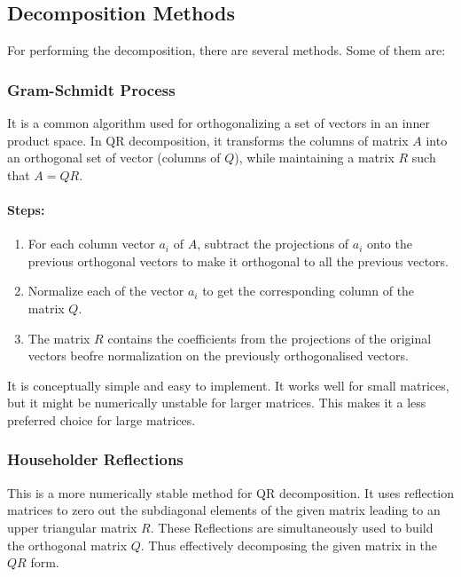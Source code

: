 \documentclass{article}
\begin{document}
\subsection{Decomposition Methods}
For performing the decomposition, there are several methods. Some of them are:
\subsubsection{Gram-Schmidt Process}
It is a common algorithm used for orthogonalizing a set of vectors in an inner product space. In QR decomposition, it transforms the columns of matrix $A$ into an orthogonal set of vector (columns of $Q$), while maintaining a matrix $R$ such that $A = QR$.
\paragraph{Steps:}
\begin{enumerate}
    \item For each column vector $a_i$ of $A$, subtract the projections of $a_i$ onto the previous orthogonal vectors to make it orthogonal to all the previous vectors.
    \item Normalize each of the vector $a_i$ to get the corresponding column of the matrix $Q$.
    \item The matrix $R$ contains the coefficients from the projections of the original vectors beofre normalization on the previously orthogonalised vectors.
\end{enumerate}
It is conceptually simple and easy to implement. It works well for small matrices, but it might be numerically unstable for larger matrices. This makes it a less preferred choice for large matrices.


\subsubsection{Householder Reflections}
This is a more numerically stable method for QR decomposition. It uses reflection matrices to zero out the subdiagonal elements of the given matrix leading to an upper triangular matrix $R$. These Reflections are simultaneously used to build the orthogonal matrix $Q$. Thus effectively decomposing the given matrix in the $QR$ form.
\end{document}
